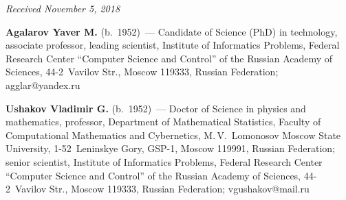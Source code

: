 \begin{multicols}{2}
{{ }
 }

\end{multicols}

\vspace*{-6pt}

\hfill{\small\textit{Received November 5, 2018}}



\Contr

\noindent
\textbf{Agalarov Yaver M.} (b.\ 1952)~--- Candidate of Science (PhD) in technology,
associate professor, leading scientist, Institute of Informatics Problems, Federal Research 
Center ``Computer Science and Control'' of the Russian Academy of Sciences, 
44-2~Vavilov Str., Moscow 119333, Russian Federation; \mbox{agglar@yandex.ru}

\vspace*{3pt}

\noindent
\textbf{Ushakov Vladimir G.} (b.\ 1952)~--- Doctor of Science in physics
and mathematics, professor, Department of Mathematical Statistics, Faculty of 
Computational Mathematics and Cybernetics, M.\,V.~Lomonosov Moscow State University,
1-52~Leninskye Gory, GSP-1, Moscow 119991,  Russian Federation;
senior scientist, Institute of Informatics Problems, Federal Research 
Center ``Computer Science and Control'' of the Russian Academy of Sciences, 
44-2~Vavilov Str., Moscow 119333, Russian Federation; \mbox{vgushakov@mail.ru}

\label{end\stat}

\renewcommand{\bibname}{\protect\rm Литература}       